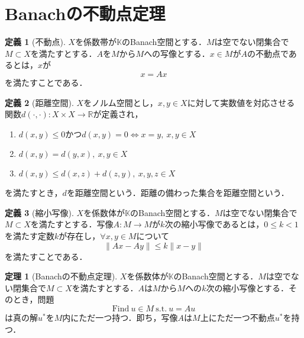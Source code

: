 \documentclass[11pt,a4paper,titlepage]{jsreport}
\theoremstyle{definition}
\newtheorem{dfn}{定義}
\newtheorem{thm}{定理}
\begin{document}
\section{Banachの不動点定理}
\begin{dfn}[不動点]
  $X$を係数帯が$\mathbb{K}$のBanach空間とする．$M$は空でない閉集合で$M\subset X$を満たすとする．$A$を$M$から$M$への写像とする．$x\in M$が$A$の不動点であるとは，$x$が
  \begin{equation*}
    x=Ax
  \end{equation*}
  を満たすことである．
\end{dfn}

\begin{dfn}[距離空間]
  $X$をノルム空間とし，$x,y\in X$に対して実数値を対応させる関数$d(\cdot,\cdot):X\times X\rightarrow \mathbb{R}$が定義され，
  \begin{enumerate}
    \item $d(x,y) \leq 0$かつ$d(x,y)=0 \Leftrightarrow x=y,\ x,y\in X$
    \item $d(x,y)=d(y,x),\ x,y\in X$
    \item $d(x,y)\leq d(x,z) + d(z,y),\ x,y,z\in X$
  \end{enumerate}
  を満たすとき，$d$を距離空間という．距離の備わった集合を距離空間という．
\end{dfn}

\begin{dfn}[縮小写像]
  $X$を係数体が$\mathbb{K}$のBanach空間とする．$M$は空でない閉集合で$M\subset X$を満たすとする．写像$A:M\rightarrow M$が$k$次の縮小写像であるとは，$0\leq k<1$を満たす定数$k$が存在し，$\forall x,y \in M$について
  \begin{equation*}
    \|Ax-Ay\|\leq k\|x-y\|
  \end{equation*}
  を満たすことである．
\end{dfn}

\begin{thm}[Banachの不動点定理]
  \label{thm:Banachの不動点定理}
  $X$を係数体が$\mathbb{K}$のBanach空間とする．$M$は空でない閉集合で$M\subset X$を満たすとする．$A$は$M$から$M$への$k$次の縮小写像とする．そのとき，問題
  \begin{equation}
    \label{equ:Banachの不動点定理}
    \mathrm{Find}\ u\in M\ \mathrm{s.t.} \ u=Au
  \end{equation}
  は真の解$u^*$を$M$内にただ一つ持つ．即ち，写像$A$は$M$上にただ一つ不動点$u^*$を持つ．
\end{thm}
\end{document}
